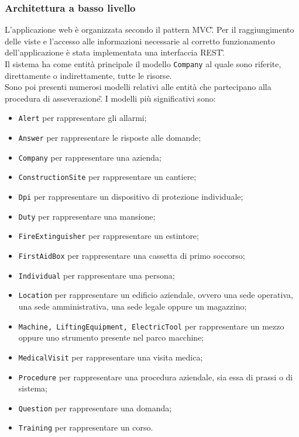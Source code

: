 \subsubsection{Architettura a basso livello}
L'applicazione web è organizzata secondo il pattern \gls{MVC}\G. Per il raggiungimento delle viste e l'accesso alle informazioni necessarie al corretto funzionamento dell'applicazione è stata implementata una interfaccia \gls{REST}\G. \\
Il sistema ha come entità principale il modello \texttt{Company} al quale sono riferite, direttamente o indirettamente, tutte le risorse.\\ 
Sono poi presenti numerosi modelli relativi alle entità che partecipano alla procedura di \gls{asseverazione}\G.
I modelli più significativi sono:
\begin{itemize} 
	\item \texttt{Alert} per rappresentare gli allarmi;
	\item \texttt{Answer} per rappresentare le risposte alle domande;
	\item \texttt{Company} per rappresentare una azienda;
	\item \texttt{ConstructionSite} per rappresentare un cantiere;
	\item \texttt{Dpi} per rappresentare un dispositivo di protezione individuale;
	\item \texttt{Duty} per rappresentare una mansione;
	\item \texttt{FireExtinguisher}  per rappresentare un estintore;
	\item \texttt{FirstAidBox} per rappresentare una cassetta di primo soccorso;
	\item \texttt{Individual} per rappresentare una persona;
	\item \texttt{Location} per rappresentare un edificio aziendale, ovvero una sede operativa, una sede amministrativa, una sede legale oppure un magazzino;
	\item \texttt{Machine, LiftingEquipment, ElectricTool}  per rappresentare un mezzo oppure uno strumento presente nel parco macchine;
	\item \texttt{MedicalVisit} per rappresentare una visita medica;
	\item \texttt{Procedure} per rappresentare una procedura aziendale, sia essa di prassi o di sistema;
	\item \texttt{Question} per rappresentare una domanda;
	\item \texttt{Training} per rappresentare un corso.
\end{itemize}	
